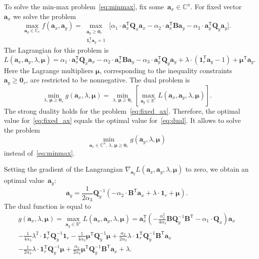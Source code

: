 \documentclass[12pt,twoside]{article}
\theoremstyle{definition}
\newcommand{\ba}{\mathbf{a}}
\newcommand{\bB}{\mathbf{B}}
\newcommand{\bQ}{\mathbf{Q}}
\newcommand{\bbR}{\mathbb{R}}
\newcommand{\T}{\mathsf{T}}
\newcommand{\bmu}{\boldsymbol{\mu}}
\newcommand{\bOne}{\boldsymbol{1}}
\newcommand{\bZero}{\boldsymbol{0}}
\begin{document}
To solve the min-max problem~\eqref{eq:minmax}, fix some~$\ba_x \in \mathbb{C}^n$. For fixed vector~$\ba_x$ we solve the problem
\begin{equation}
	\max_{\ba_y \in \mathbb{C}_r} f(\ba_x, \ba_y) = \max_{\substack{\ba_y \geq \bZero_r \\ \bOne_r^{\T}\ba_y=1}} \bigl[\alpha_1 \cdot \ba_x^{\T} \bQ_x \ba_x - \alpha_2 \cdot \ba_x^{\T} \bB \ba_y - \alpha_3 \cdot \ba_y^{\T} \bQ_y \ba_y \bigr].
	\label{eq:fixed_ax}
\end{equation}
The Lagrangian for this problem is
\[
	L(\ba_x, \ba_y, \lambda, \bmu) = \alpha_1 \cdot \ba_x^{\T} \bQ_x \ba_x - \alpha_2 \cdot \ba_x^{\T} \bB \ba_y - \alpha_3 \cdot \ba_y^{\T} \bQ_y \ba_y + \lambda \cdot  (\bOne_r^{\T} \ba_y - 1) + \bmu^{\T} \ba_y.
\]
Here the Lagrange multipliers $\bmu$, corresponding to the inequality constraints $\ba_y \geq \bZero_r$, are restricted to be nonnegative.
The dual problem is
\begin{equation}
	\min_{\lambda, \, \bmu \geq \bZero_r} g(\ba_x, \lambda, \bmu) = \min_{\lambda, \, \bmu \geq \bZero_r}  \left[\max_{\ba_y \in \bbR^r} L(\ba_x, \ba_y, \lambda, \bmu) \right].
	\label{eq:dual}
\end{equation}
The strong duality holds for the problem~\eqref{eq:fixed_ax}. Therefore, the optimal value for~\eqref{eq:fixed_ax} equals the optimal value for~\eqref{eq:dual}. It allows to solve the problem
\begin{equation}
	\min_{\ba_x \in \mathbb{C}^n, \, \lambda, \, \bmu \geq \bZero_r} g(\ba_y, \lambda, \bmu)
	\label{eq:dual_maxmin}
\end{equation}
instead of~\eqref{eq:minmax}.

Setting the gradient of the Langrangian $\nabla_{\ba_y} L(\ba_x, \ba_y, \lambda, \bmu)$ to zero, we obtain an optimal value~$\ba_y$:
\begin{equation}
	\ba_y = \frac{1}{2\alpha_3} \bQ_y^{-1} \left( - \alpha_2 \cdot \bB^{\T} \ba_x +\lambda \cdot \bOne_r + \bmu \right).
	\label{eq:ax}
\end{equation}
The dual function is equal to
\begin{multline}
	g(\ba_x, \lambda, \bmu)
	= \max_{\ba_y \in \bbR^r} L(\ba_x, \ba_y, \lambda, \bmu) =
	\ba_x^{\T} \left( - \frac{\alpha_2^2}{4\alpha_3} \bB \bQ_y^{-1} \bB^{\T} - \alpha_1 \cdot \bQ_x\right) \ba_x \\ - \frac{1}{4 \alpha_3} \lambda^2 \cdot \bOne_r^{\T} \bQ_y^{-1} \bOne_r - \frac{1}{4 \alpha_3} \bmu^{\T} \bQ_y^{-1} \bmu + \frac{\alpha_2}{2 \alpha_3} \lambda \cdot \bOne_r^{\T} \bQ_y^{-1} \bB^{\T} \ba_x \\ - \frac{1}{2 \alpha_3} \lambda \cdot \bOne_r^{\T} \bQ_y^{-1} \bmu + \frac{\alpha_2}{2 \alpha_3} \bmu^{\T} \bQ_y^{-1} \bB^{\T} \ba_x + \lambda.
	 \label{eq:dual_quadratic_form}
\end{multline}
\end{document}

